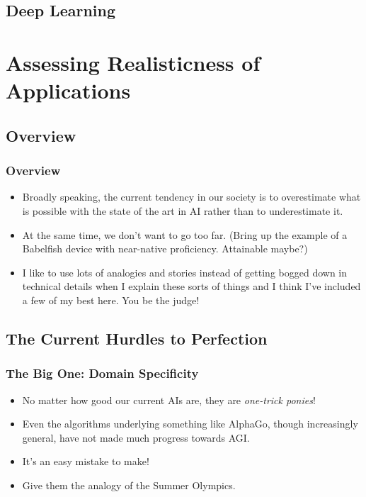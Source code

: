 \documentclass[10pt]{beamer}
\begin{document}

  \subsection{Deep Learning}

  \section{Assessing Realisticness of Applications}

  \subsection{Overview}

  \begin{frame}
    \frametitle{Overview}

    \begin{itemize}
      \item Broadly speaking, the current tendency in our society is to
        overestimate what is possible with the state of the art in AI rather
        than to underestimate it.
      \pause
      \item At the same time, we don't want to go too far. (Bring up the
        example of a Babelfish device with near-native proficiency.
        Attainable maybe?)
      \pause
      \item I like to use lots of analogies and stories instead of getting
        bogged down in technical details when I explain these sorts of things
        and I think I've included a few of my best here. You be the judge!
    \end{itemize}
  \end{frame}

  \subsection{The Current Hurdles to Perfection}

  \begin{frame}
    \frametitle{The Big One: Domain Specificity}

    \begin{itemize}
      \item No matter how good our current AIs are, they are \emph{one-trick
        ponies}!
      \pause
      \item Even the algorithms underlying something like AlphaGo, though
        increasingly general, have not made much progress towards AGI.
      \pause
      \item It's an easy mistake to make!
      \pause
      \item Give them the analogy of the Summer Olympics.
    \end{itemize}
  \end{frame}
\end{document}
